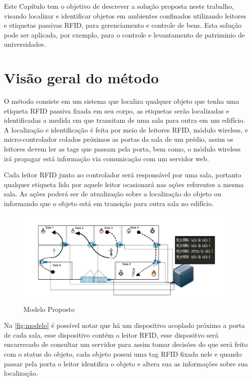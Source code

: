 \label{chapter:metodo}

Este Capítulo tem o objetivo de descrever a solução proposta neste trabalho, visando localizar e identificar objetos 
em ambientes confinados utilizando leitores e etiquetas passivas RFID, para gerenciamento e controle de bens.
%
Esta solução pode ser aplicada, por exemplo, para o controle e levantamento de patriminio de universidades.

%
%
\section{Visão geral do método}

O método consiste em um sistema que localiza qualquer objeto que tenha uma etiqueta RFID passiva fixada em seu corpo, 
as etiquetas serão localizadas e identificadas a medida em que transitam de uma sala para outra em um edifício. 
%
A localização e identificação é feita por meio de leitores RFID, módulo wireless, e micro-controlador colados próximos as portas da sala
de um prédio, assim os leitores devem ler as tags que passam pela porta, bem como, o módulo wireless irá propagar está informação via 
comunicação com um servidor web.


Cada leitor RFID junto ao controlador será responsável por uma sala, portanto qualquer etiqueta lida por aquele leitor 
ocasionará nas ações referentes a mesma sala. As ações poderá ser de atualização sobre a localização do objeto ou informando 
que o objeto está em transição para outra sala no edifício.
\begin{figure}[H]
              \caption{\label{fig:modelo}{Modelo Proposto}}
              \centering
              \includegraphics[width=1.1\textwidth]{Figuras/bigpicture.png}
        \end{figure}

\par
Na \autoref{fig:modelo} é possível notar que há um dispositivo acoplado próximo a 
porta de cada sala, esse dispositivo contém o leitor RFID, esse dispositvo será encarrecado de consultar um 
servidor para assim tomar decisões do que será feito com o status do objeto, cada objeto possui uma tag RFID fixada 
nele e quando passar pela porta o leitor identifica o objeto e altera sua as informações sobre sua localização.

